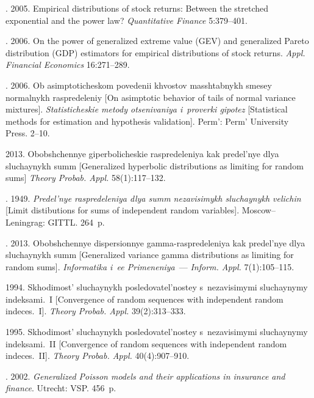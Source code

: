 \begin{multicols}{2}
{{\begin{thebibliography}{99}
. 2005.
Empirical distributions of stock returns: Between the
stretched exponential and the power law? 
\textit{Quantitative Finance} 5:379--401.

. 2006.
On the power of generalized extreme value (GEV) and
generalized Pareto distribution (GDP) estimators for empirical
distributions of stock returns. \textit{Appl. Financial Economics}
16:271--289.

. 2006.
Ob asimptoticheskom povedenii khvostov masshtabnykh smesey normalnykh raspredeleniy
[On asimptotic behavior of tails of normal variance mixtures].
\textit{Statisticheskie metody otsenivaniya i~proverki gipotez} 
[Statistical methods for estimation and hypothesis validation]. 
Perm': Perm' University Press. 2--10.

  2013.
Obobshchennye giperbolicheskie raspredeleniya kak predel'nye dlya sluchaynykh summ
[Generalized hyperbolic distributions as limiting for random sums]
\textit{Theory Probab. Appl.} 58(1):117--132.

. 1949. 
\textit{Predel'nye raspredeleniya dlya summ nezavisimykh sluchaynykh velichin} 
[Limit distibutions for sums of independent random variables]. Moscow--Leningrag: GITTL.
264~p.

 . 2013.
Obobshchennye dispersionnye gamma-raspredeleniya kak predel'nye dlya sluchaynykh summ
[Generalized variance gamma distributions as limiting for random sums].
\textit{Informatika i~ee Primeneniya}~--- \textit{Inform. Appl.} 7(1):105--115.

  1994. 
Skhodimost' sluchaynykh posledovatel'nostey s~nezavisimymi sluchaynymy indeksami.~I 
[Convergence of random sequences with independent random indeces.~I]. 
\textit{Theory Probab. Appl.} 39(2):313--333.

 1995. Skhodimost' sluchaynykh posledovatel'nostey 
s~nezavisimymi sluchaynymy indeksami.~II 
[Convergence of random sequences with independent random indeces.~II]. 
\textit{Theory Probab. Appl.} 40(4):907--910.

. 2002. 
\textit{Generalized Poisson models and their applications in insurance and finance}. 
Utrecht: VSP. 456~p.


\end{thebibliography}}}
\end{multicols}
